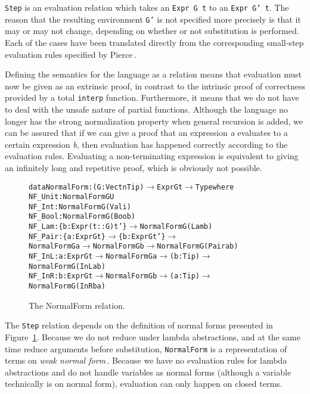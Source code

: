 \texttt{Step} is an evaluation relation which takes an \texttt{Expr G t} to an \texttt{Expr G' t}. The reason that the resulting environment \texttt{G'} is not specified more precisely is that it may or may not change, depending on whether or not substitution is performed. Each of the cases have been translated directly from the corresponding small-step evaluation rules specified by Pierce\,\cite{Pierce:TypeSystems}.

Defining the semantics for the language as a relation means that evaluation must now be given as an extrinsic proof, in contrast to the intrinsic proof of correctness provided by a total \texttt{interp} function. Furthermore, it means that we do not have to deal with the unsafe nature of partial functions. Although the language no longer has the strong normalization property when general recursion is added, we can be assured that if we can give a proof that an expression \textit{a} evaluates to a certain expression \textit{b}, then evaluation has happened correctly according to the evaluation rules. Evaluating a non-terminating expression is equivalent to giving an infinitely long and repetitive proof, which is obviously not possible. 

\begin{figure}
\begin{alltt}
  data NormalForm : (G: Vect n Tip) \(\rightarrow\) Expr G t \(\rightarrow\) Type where
    NF_Unit : NormalForm G U
    NF_Int  : NormalForm G (Val i)
    NF_Bool : NormalForm G (Boo b)
    NF_Lam  : \{b: Expr (t :: G) t'\} \(\rightarrow\) NormalForm G (Lam b)
    NF_Pair : \{a: Expr G t\} \(\rightarrow\) \{b: Expr G t'\} \(\rightarrow\) 
              NormalForm G a \(\rightarrow\) NormalForm G b \(\rightarrow\) NormalForm G (Pair a b)
    NF_InL  : {a: Expr G t} \(\rightarrow\) NormalForm G a \(\rightarrow\) (b: Tip) \(\rightarrow\) NormalForm G (InL a b)
    NF_InR  : {b: Expr G t} \(\rightarrow\) NormalForm G b \(\rightarrow\) (a: Tip) \(\rightarrow\) NormalForm G (InR b a)
\end{alltt}
\caption{The NormalForm relation.}
\label{fig:normal-forms}
\end{figure}
The \texttt{Step} relation depends on the definition of normal forms presented in Figure~\ref{fig:normal-forms}. Because we do not reduce under lambda abstractions, and at the same time reduce arguments before substitution, \texttt{NormalForm} is a representation of terms on \emph{weak normal form}\,\cite{Sestoft:reduction}. Because we have no evaluation rules for lambda abstractions and do not handle variables as normal forms (although a variable technically is on normal form), evaluation can only happen on closed terms.

